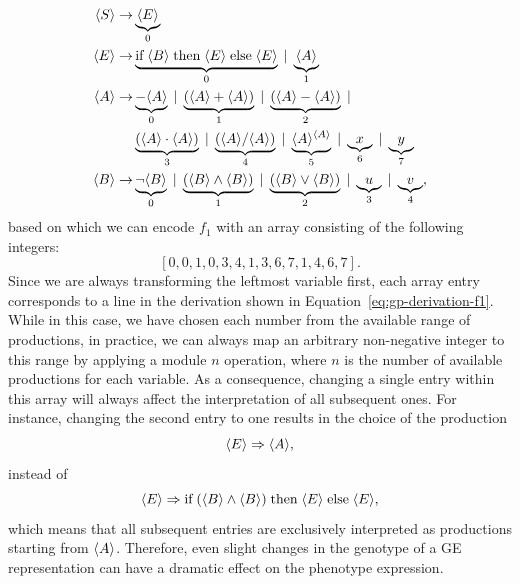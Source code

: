 \begin{equation*}
	\begin{split}
		\langle S \rangle \to & \underbrace{\langle E \rangle}_{0} \\
		\langle E \rangle \to & \underbrace{\text{if} \; \langle B \rangle \; \text{then} \; \langle E \rangle \; \text{else} \; \langle E \rangle}_{0} \; | \; \underbrace{\langle A \rangle}_{1} \\
		\langle A \rangle \to & \underbrace{-\langle A \rangle}_0 \; | \; \underbrace{(\langle A \rangle + \langle A \rangle)}_{1} \; | \; \underbrace{(\langle A \rangle - \langle A \rangle)}_2 \; |   \\  
		& \underbrace{(\langle A \rangle \cdot \langle A \rangle)}_{3} \; | \; \underbrace{(\langle A \rangle / \langle A \rangle)}_{4} \; | \; \underbrace{\langle A \rangle^{\langle A \rangle}}_{5} \; | \; \underbrace{x}_{6} \; | \; \underbrace{y}_{7} \\
		\langle B \rangle \to & \underbrace{\neg \langle B \rangle}_{0} \; | \; \underbrace{(\langle B \rangle \wedge \langle B \rangle)}_{1} \; | \; \underbrace{(\langle B \rangle \vee \langle B \rangle)}_{2} \; | \; \underbrace{u}_3 \; | \; \underbrace{v}_4,
	\end{split}
	\label{eq:gp-example-grammar-ge-encoding}
\end{equation*}
based on which we can encode $f_1$ with an array consisting of the following integers:
\begin{equation*}
	\left[ 0, 0, 1, 0, 3, 4, 1, 3, 6, 7, 1, 4, 6, 7 \right].
\end{equation*}
Since we are always transforming the leftmost variable first, each array entry corresponds to a line in the derivation shown in Equation~\eqref{eq:gp-derivation-f1}.
While in this case, we have chosen each number from the available range of productions, in practice, we can always map an arbitrary non-negative integer to this range by applying a module $n$ operation, where $n$ is the number of available productions for each variable.
As a consequence, changing a single entry within this array will always affect the interpretation of all subsequent ones.
For instance, changing the second entry to one results in the choice of the production 
\begin{equation*}
	\langle E \rangle \Rightarrow \langle A \rangle,
\end{equation*}
instead of 
\begin{equation*}
	\langle E \rangle \Rightarrow \text{if} \; (\langle B \rangle \wedge \langle B \rangle) \; \text{then} \; \langle E \rangle \; \text{else} \; \langle E \rangle,
\end{equation*}
which means that all subsequent entries are exclusively interpreted as productions starting from $\langle A \rangle$.
Therefore, even slight changes in the genotype of a GE representation can have a dramatic effect on the phenotype expression.

